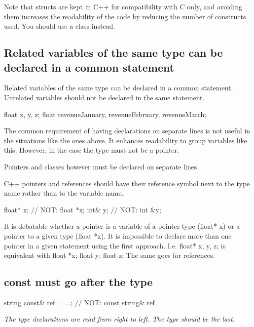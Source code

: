 \documentclass[a4paper,11pt,oneside]{scrbook}
\newcommand{\guideline}[1]{{\subsection{#1}}}
\newcommand{\motivation}[1]{{\normalfont \itshape #1}}
\newcommand{\trcode}[1]{{\normalfont \ttfamily #1}}
\begin{document}
Note that structs are kept in C++ for compatibility with C only, and
avoiding them increases the readability of the code by reducing the
number of constructs used. You should use a class instead.

\guideline{Related variables of the same type can be declared in a common statement}

Related variables of the same type can be declared in a common statement.
Unrelated variables should not be declared in the same statement. 

\begin{code}
  float x, y, z;
  float revenueJanuary, revenueFebruary, revenueMarch; 
\end{code}

The common requirement of having declarations on separate lines is not
useful in the situations like the ones above. It enhances readability
to group variables like this. However, in the case the type must not be
a pointer.

Pointers and classes however must be declared on separate lines.

C++ pointers and references should have their reference symbol next to
the type name rather than to the variable name.

\begin{code}
  float* x;    // NOT: float *x;
  int&   y;    // NOT: int &y;
\end{code}

It is debatable whether a pointer is a variable of a pointer type
(float* x) or a pointer to a given type (float *x). It is impossible
to declare more than one pointer in a given statement using the first
approach. I.e. float* x, y, z; is equivalent with float *x; float y;
float z; The same goes for references.

\guideline{\trcode{const} must go after the type}

\begin{code}
  string const& ref = ...;      // NOT: const string& ref
\end{code}

\motivation{
  The type declarations are read from right to left. The type should be the last.
}
\end{document}
